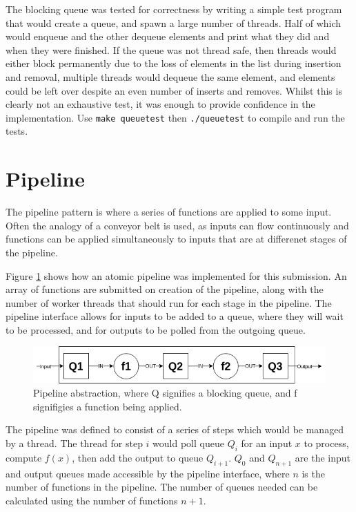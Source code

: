 \documentclass[12pt]{article}
\def\code#1{\texttt{#1}}
\begin{document}
The blocking queue was tested for correctness by writing a simple test program that would create a queue, and spawn a large number of threads. Half of which would enqueue and the other dequeue elements and print what they did and when they were finished. If the queue was not thread safe, then threads would either block permanently due to the loss of elements in the list during insertion and removal, multiple threads would dequeue the same element, and elements could be left over despite an even number of inserts and removes. Whilst this is clearly not an exhaustive test, it was enough to provide confidence in the implementation. Use \code{make queuetest} then \code{./queuetest} to compile and run the tests.

\section{Pipeline} 

The pipeline pattern is where a series of functions are applied to some input. Often the analogy of a conveyor belt is used, as inputs can flow continuously and functions can be applied simultaneously to inputs that are at differenet stages of the pipeline.

Figure \ref{fig:pipe} shows how an atomic pipeline was implemented for this submission. An array of functions are submitted on creation of the pipeline, along with the number of worker threads that should run for each stage in the pipeline. The pipeline interface allows for inputs to be added to a queue, where they will wait to be processed, and for outputs to be polled from the outgoing queue. 

\begin{figure}[!ht]
	\centering 
	\includegraphics[width=\linewidth]{images/pipe}
	\caption{Pipeline abstraction, where Q signifies a blocking queue, and f signifigies a function being applied.}
	\label{fig:pipe}
\end{figure}

The pipeline was defined to consist of a series of steps which would be managed by a thread. The thread for step $i$ would poll queue $Q_i$ for an input $x$ to process, compute $f(x)$, then add the output to queue $Q_{i+1}$. $Q_0$ and $Q_{n+1}$ are the input and output queues made accessible by the pipeline interface, where $n$ is the number of functions in the pipeline. The number of queues needed can be calculated using the number of functions $n+1$. 
\end{document}
